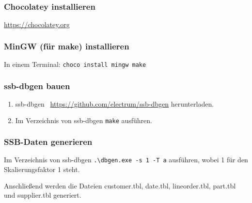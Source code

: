 \label{sec:appendix-generate-ssb-data}
\subsubsection{Chocolatey installieren}
\url{https://chocolatey.org}
\subsubsection{MinGW (für make) installieren}
In einem Terminal:
\lstinline{choco install mingw make}
\subsubsection{ssb-dbgen bauen}
\begin{enumerate}
    \item ssb-dbgen~\cite{phillips_electrumssb-dbgen_2023} \url{https://github.com/electrum/ssb-dbgen} herunterladen.
    \item Im Verzeichnis von ssb-dbgen \lstinline{make} ausführen.
\end{enumerate}
\subsubsection{\acs{SSB}-Daten generieren}
Im Verzeichnis von ssb-dbgen \lstinline{.\dbgen.exe -s 1 -T a} ausführen, wobei 1 für den Skalierungsfaktor 1 steht.

Anschließend werden die Dateien customer.tbl, date.tbl, lineorder.tbl, part.tbl und supplier.tbl generiert.

